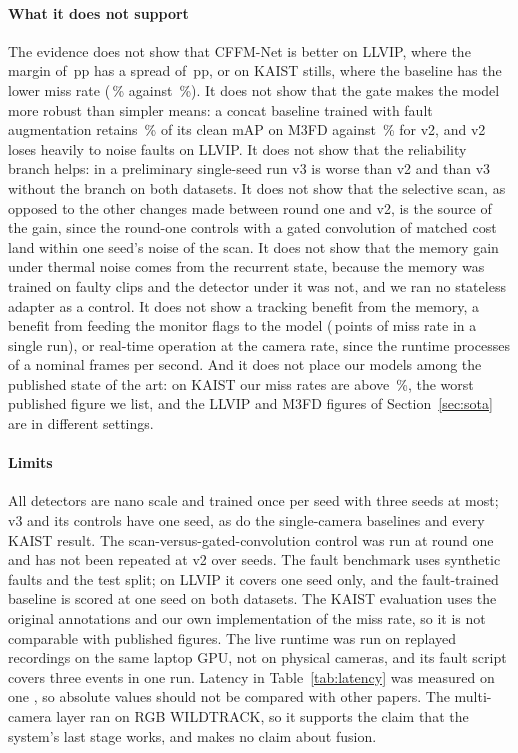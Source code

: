 \paragraph{What it does not support}
The evidence does not show that CFFM-Net is better on LLVIP, where the margin of \marLlvipVtwoVsConcatMdMeanMap{}\,pp has a spread of \marLlvipVtwoVsConcatMdStdMap{}\,pp, or on KAIST stills, where the baseline has the lower miss rate (\kstConcatAllMr{}\,\% against \kstCffmAllMr{}\,\%). It does not show that the gate makes the model more robust than simpler means: a concat baseline trained with fault augmentation retains \fltMfdConcatFtRetainedSevThreePercent{}\,\% of its clean mAP on M3FD against \fltMfdCffmVtwoMeanRetainedSevThreePercent{}\,\% for v2, and v2 loses heavily to noise faults on LLVIP. It does not show that the reliability branch helps: in a preliminary single-seed run v3 is worse than v2 and than v3 without the branch on both datasets. It does not show that the selective scan, as opposed to the other changes made between round one and v2, is the source of the gain, since the round-one controls with a gated convolution of matched cost land within one seed's noise of the scan. It does not show that the memory gain under thermal noise comes from the recurrent state, because the memory was trained on faulty clips and the detector under it was not, and we ran no stateless adapter as a control. It does not show a tracking benefit from the memory, a benefit from feeding the monitor flags to the model (\livFaultMrChange{}\,points of miss rate in a single run), or real-time operation at the camera rate, since the runtime processes \livSoakThirtyFps{} of a nominal \livSoakThirtyNominalFps{} frames per second. And it does not place our models among the published state of the art: on KAIST our miss rates are above \sotaKaistMrMax{}\,\%, the worst published figure we list, and the LLVIP and M3FD figures of Section~\ref{sec:sota} are in different settings.

\paragraph{Limits}
All detectors are nano scale and trained once per seed with three seeds at most; v3 and its controls have one seed, as do the single-camera baselines and every KAIST result. The scan-versus-gated-convolution control was run at round one and has not been repeated at v2 over seeds. The fault benchmark uses synthetic faults and the test split; on LLVIP it covers one seed only, and the fault-trained baseline is scored at one seed on both datasets. The KAIST evaluation uses the original annotations and our own implementation of the miss rate, so it is not comparable with published figures. The live runtime was run on replayed recordings on the same laptop GPU, not on physical cameras, and its fault script covers three events in one run. Latency in Table~\ref{tab:latency} was measured on one \latLocalDevice{}, so absolute values should not be compared with other papers. The multi-camera layer ran on RGB WILDTRACK, so it supports the claim that the system's last stage works, and makes no claim about fusion.

